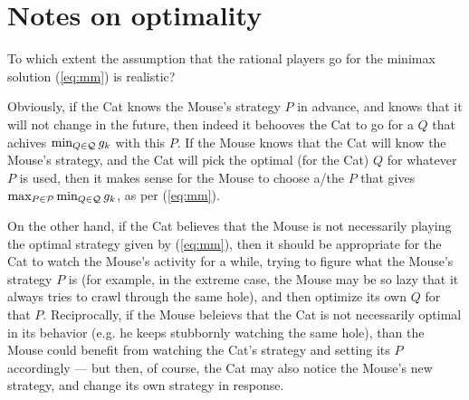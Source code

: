 \documentclass[12pt]{article}
\begin{document}
\section{Notes on optimality}
To which extent the assumption that the rational players go for the minimax solution (\ref{eq:mm}) is realistic? 

Obviously, if the Cat knows the Mouse's strategy $P$ in advance, and knows that it will not change in the future, then indeed it behooves the Cat to go for a $Q$ that achives $\min_{Q\in\cal{Q}} g_k$ with this $P$. If the Mouse knows that the Cat will know the Mouse's strategy, and the Cat will pick the optimal (for the Cat) $Q$ for whatever $P$ is used, then it makes sense for the Mouse to choose a/the $P$ that gives $\max_{P\in\cal{P}} \min_{Q\in\cal{Q}} g_k$, as per (\ref{eq:mm}).

On the other hand, if the Cat believes that the Mouse is not necessarily playing the optimal strategy given by  (\ref{eq:mm}), then it should be appropriate for the Cat to watch the Mouse's activity for a while, trying to figure what the Mouse's strategy $P$ is (for example, in the extreme case, the Mouse may be so lazy that it always tries to crawl through the same hole), and then optimize its own $Q$ for that $P$. Reciprocally, if the Mouse beleievs that the Cat is not necessarily optimal in its behavior (e.g. he keeps stubbornly watching the same hole), than the Mouse could benefit from watching the Cat's strategy and setting its $P$ accordingly --- but then, of course, the Cat may also notice the Mouse's new strategy, and change its own strategy in response.
\end{document}

